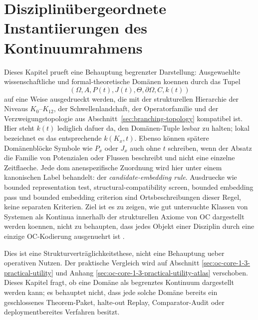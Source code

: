 
\section{Disziplinübergeordnete Instantiierungen des Kontinuumrahmens}
\label{sec:disciplines-extended}

Dieses Kapitel prueft eine Behauptung begrenzter Darstellung: Ausgewaehlte
wissenschaftliche und formal-theoretische Domänen koennen durch das Tupel
\[
  (\Omega, A, P(t), J(t), \Theta, \partial\Omega, C, k(t))
\]
auf eine Weise ausgedrueckt werden, die mit der strukturellen Hierarchie der
Niveaus \(K_0\)--\(K_{12}\), der Schwellenlandchaft, der Operatorfamilie und der
Verzweigungstopologie aus Abschnitt~\ref{sec:branching-topology} kompatibel ist.
Hier steht \(k(t)\) lediglich dafuer da, den Domänen-Tuple lesbar zu halten;
lokal bezeichnet es das entsprechende \(k(K_x,t)\).
Ebenso können spätere Domänenblöcke Symbole wie \(P_x\) oder \(J_x\)
auch ohne \(t\) schreiben, wenn der Absatz die Familie von Potenzialen oder
Flussen beschreibt und nicht eine einzelne Zeitflaeche.
Jede domanenspezifische Zuordnung wird hier unter einem kanonischen Label behandelt:
der \emph{candidate-embedding rule}. Ausdruecke wie bounded
representation test, structural-compatibility screen, bounded embedding pass und
bounded embedding criterion sind Ortsbeschreibungen dieser Regel, keine
separaten Kriterien. Ziel ist es zu zeigen, wie gut untersuchte Klassen von
Systemen als Kontinua innerhalb der strukturellen Axiome von OC dargestellt werden
koennen, nicht zu behaupten, dass jedes Objekt einer Disziplin durch eine
einzige OC-Kodierung ausgenuehrt ist
\parencite{anderson_more_is_different}.

Dies ist eine Strukturverträglichkeitsthese, nicht eine Behauptung ueber
operativen Nutzen. Der praktische Vergleich wird auf Abschnitt
\ref{sec:oc-core-1-3-practical-utility} und Anhang
\ref{sec:oc-core-1-3-practical-utility-atlas} verschoben. Dieses Kapitel fragt,
ob eine Domäne als begrenztes Kontinuum dargestellt werden kann; es behauptet
nicht, dass jede solche Domäne bereits ein geschlossenes Theorem-Paket,
halte-out Replay, Comparator-Audit oder deploymentbereites Verfahren besitzt.

